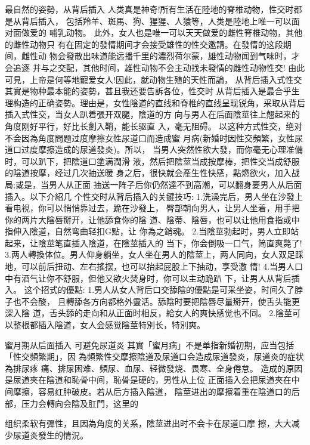 \documentclass[12pt,UTF8]{ctexbook}
\begin{document}
最自然的姿勢，从背后插入
人类真是神奇!所有生活在陸地的脊椎动物，性交时都是从背后插入，
包括羚羊、斑馬、狗、猩猩、人猿等，人类是陸地上唯一可以面对面做爱的
哺乳动物。
此外，女人也是唯一可以天天做爱的雌性脊椎动物，其他的雌性动物只
有在固定的發情期间才会接受雄性的性交邀請。在發情的这段期间，雌性动
物会發散出味道能远播千里的濃烈荷尔蒙，雄性动物闻到气味时，才会追逐
并与之交配，其他时间，雄性动物不会主动找未發情的雌性动物性交!
由此可見，上帝是何等地寵爱女人!因此，就动物生殖的天性而論，
从背后插入式性交其實是物种最本能的姿勢，甚且我还要告訴各位，性交时
从背后插入是最合乎生理构造的正确姿勢。理由是，女性陰道的直线和脊椎的直线呈现锐角，采取从背后插入式性交，当女人趴着張开双腿，陰道的方
向与男人在后面陰莖往上翹起来的角度刚好平行，好比长劍入鞘，能长驱直
入，毫无阻碍。
以这种方式性交，绝对不会因為角度問题过度摩擦女性尿道口而造成蜜
月病(新婚时因性交頻繁，女性尿道口过度摩擦造成的尿道發炎)。所以，
当男人突然性欲大發，而你毫无心理准備时，可以趴下，把陰道口塗满潤滑
液，然后把陰莖当成按摩棒，把性交当成舒服的陰道按摩，经过几次抽送暖
身之后，很快就会產生性快感，點燃欲火，加入战局;或是，当男人从正面
抽送一阵子后你仍然達不到高潮，可以翻身要男人从后面插入。以下介紹几
个性交时从背后插入的关鍵技巧:
1.洗澡完后，男人坐在沙發上看电視，你可以悄悄靠过去，跪在沙發上，
臀部朝向男人，让男人坐着，用手把你的两片大陰唇掰开，让他舔食你的陰
道、陰蒂、陰唇，也可以让他用食指或中指伸入陰道，自然弯曲轻扣G點，让
你為之銷魂。
2.当陰莖勃起时，男人立即站起来，让陰莖笔直插入陰道，在陰莖插入的
当下，你会倒吸一口气，简直爽斃了!
3.两人轉換体位。男人仰身躺坐，女人坐在男人的陰莖上，两人同向，女人双足踩地，可以前后扭动、左右搖摆，也可以抬起屁股上下抽动，享受激
情!
4.当男人口中有酒气让你不舒服，但他又欲火焚身时，你可以主动跪趴
下，让男人从背后插入。
这个招式的優點:
1.男人从女人背后口交舔陰的優點是可采坐姿，时间久了脖子也不会酸，
且轉舔各方向都格外靈活。舔陰时要把陰唇尽量掰开，使舌头能更深入陰
道，舌头舔的走向和从正面时相反，給女人的爽快感觉也不同。
2.陰莖可以整根都插入陰道，女人会感觉陰莖特別长，特別爽。

蜜月期从后面插入
可避免尿道炎
其實「蜜月病」不是单指新婚初期，应当包括「性交頻繁期」，因
為頻繁性交摩擦陰道及尿道口会造成尿道發炎，尿道炎的症状為排尿疼
痛、排尿困难、頻尿、血尿、轻微發烧、畏寒、全身倦怠。
造成的原因是尿道夾在陰道和恥骨中间，恥骨是硬的，男性从上位
正面插入会把尿道夾在中间摩擦，容易红肿破皮。若从后方插入陰道，
陰莖进出的摩擦着重在陰道口的后部，压力会轉向会陰及肛門，这里的

组织柔软有彈性，且因為角度的关系，陰莖进出时不会卡在尿道口摩
擦，大大减少尿道炎發生的情況。
\end{document}
